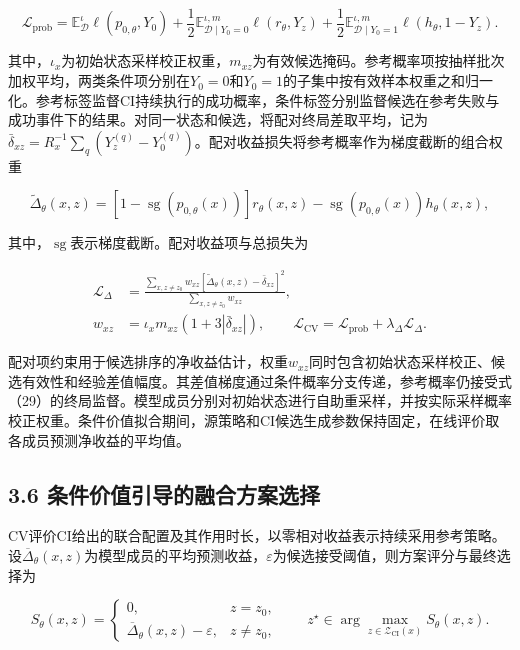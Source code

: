 \documentclass[UTF8,a4paper,zihao=5,fontset=none]{ctexart}
\begin{document}
\[
\mathcal L_{\mathrm{prob}}
=\mathbb E_{\mathcal D}^{\iota}\ell(p_{0,\theta},Y_0)
+\frac12\mathbb E_{\mathcal D\mid Y_0=0}^{\iota,m}\ell(r_\theta,Y_z)
+\frac12\mathbb E_{\mathcal D\mid Y_0=1}^{\iota,m}\ell(h_\theta,1-Y_z).
\tag{29}
\]

其中，\(\iota_x\)为初始状态采样校正权重，\(m_{xz}\)为有效候选掩码。参考概率项按抽样批次加权平均，两类条件项分别在\(Y_0=0\)和\(Y_0=1\)的子集中按有效样本权重之和归一化。参考标签监督CI持续执行的成功概率，条件标签分别监督候选在参考失败与成功事件下的结果。对同一状态和候选，将配对终局差取平均，记为\(\bar\delta_{xz}=R_x^{-1}\sum_q(Y_z^{(q)}-Y_0^{(q)})\)。配对收益损失将参考概率作为梯度截断的组合权重

\[
\widetilde\Delta_\theta(x,z)
=[1-\operatorname{sg}(p_{0,\theta}(x))]r_\theta(x,z)
-\operatorname{sg}(p_{0,\theta}(x))h_\theta(x,z),
\tag{30}
\]

其中，\(\operatorname{sg}\)表示梯度截断。配对收益项与总损失为

\[
\begin{aligned}
\mathcal L_\Delta
&=\frac{\displaystyle\sum_{x,z\ne z_0}w_{xz}
[\widetilde\Delta_\theta(x,z)-\bar\delta_{xz}]^2}
{\displaystyle\sum_{x,z\ne z_0}w_{xz}},\\
w_{xz}&=\iota_xm_{xz}(1+3|\bar\delta_{xz}|),
\qquad
\mathcal L_{\mathrm{CV}}=\mathcal L_{\mathrm{prob}}+\lambda_\Delta\mathcal L_\Delta.
\end{aligned}
\tag{31}
\]

配对项约束用于候选排序的净收益估计，权重\(w_{xz}\)同时包含初始状态采样校正、候选有效性和经验差值幅度。其差值梯度通过条件概率分支传递，参考概率仍接受式（29）的终局监督。模型成员分别对初始状态进行自助重采样，并按实际采样概率校正权重。条件价值拟合期间，源策略和CI候选生成参数保持固定，在线评价取各成员预测净收益的平均值。

\subsection*{3.6 条件价值引导的融合方案选择}

CV评价CI给出的联合配置及其作用时长，以零相对收益表示持续采用参考策略。设\(\overline\Delta_\theta(x,z)\)为模型成员的平均预测收益，\(\varepsilon\)为候选接受阈值，则方案评分与最终选择为

\[
S_\theta(x,z)=
\begin{cases}
0,&z=z_0,\\
\overline\Delta_\theta(x,z)-\varepsilon,&z\ne z_0,
\end{cases}
\qquad
z^\star\in\arg\max_{z\in\mathcal Z_{\mathrm{CI}}(x)}S_\theta(x,z).
\tag{32}
\]
\end{document}
